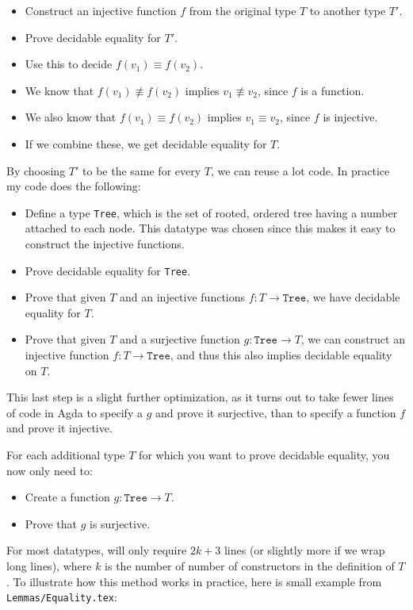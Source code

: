 \begin{itemize}
\item Construct an injective function $f$ from the original type $T$ to another
  type $T'$.
\item Prove decidable equality for $T'$.
\item Use this to decide $f(v_1) \equiv f(v_2)$.
\item We know that $f(v_1) \not\equiv f(v_2)$ implies $v_1 \not\equiv v_2$,
  since $f$ is a function.
\item We also know that $f(v_1) \equiv f(v_2)$ implies $v_1 \equiv v_2$, since
  $f$ is injective.
\item If we combine these, we get decidable equality for $T$.
\end{itemize}

By choosing $T'$ to be the same for every $T$, we can reuse a lot code. In
practice my code does the following:

\begin{itemize}
\item Define a type \texttt{Tree}, which is the set of rooted, ordered tree
  having a number attached to each node. This datatype was chosen since this
  makes it easy to construct the injective functions.
\item Prove decidable equality for \texttt{Tree}.
\item Prove that given $T$ and an injective functions $f : T \to \mathtt{Tree}$,
  we have decidable equality for $T$.
\item Prove that given $T$ and a surjective function $g : \mathtt{Tree} \to T$,
  we can construct an injective function $f : T \to \mathtt{Tree}$, and thus
  this also implies decidable equality on $T$.
\end{itemize}

This last step is a slight further optimization, as it turns out to take fewer
lines of code in Agda to specify a $g$ and prove it surjective, than to specify
a function $f$ and prove it injective.

For each additional type $T$ for which you want to prove decidable equality, you
now only need to:

\begin{itemize}
\item Create a function $g : \mathtt{Tree} \to T$.
\item Prove that $g$ is surjective.
\end{itemize}

For most datatypes, will only require $2k+3$ lines (or slightly more if we wrap
long lines), where $k$ is the number of number of constructors in the definition
of $T$. To illustrate how this method works in practice, here is small example
from \texttt{Lemmas/Equality.tex}:


